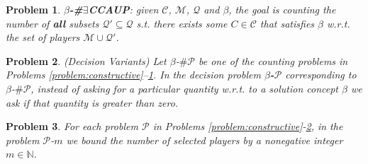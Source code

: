 \documentclass[letterpaper]{article} %
\newtheorem{problem}{Problem}
\newtheorem{remark}{Remark}
\begin{document}
\begin{problem}
\label{problem:exists-CCAUP}
{\normalfont \textbf{$\beta$-\#$\exists$CCAUP}:} given $\mathcal{C}$, $\mathcal{M}$, $\mathcal{Q}$ and $\beta$, the goal is counting the number of \textbf{all} subsets $\mathcal{Q}' \subseteq \mathcal{Q}$ s.t. there exists some $C \in \mathcal{C}$ that satisfies $\beta$ w.r.t. the set of players $\mathcal{M} \cup \mathcal{Q}'$.
\end{problem}
\begin{problem}
\label{problem:Decision}
{\normalfont (Decision Variants)}
Let {\normalfont $\beta$-$\# \mathcal{P}$} be one of the counting problems in Problems \ref{problem:constructive}--\ref{problem:exists-CCAUP}. In the decision problem {\normalfont \textbf{$\beta$-$\mathcal{P}$}} corresponding to {\normalfont $\beta$-$\#\mathcal{P}$}, instead of asking for a particular quantity w.r.t. to a solution concept $\beta$ we ask if that quantity is greater than zero.
\end{problem}
\begin{problem}
\label{problem:bounded}
For each problem {\normalfont $\mathcal{P}$} in Problems \ref{problem:constructive}-\ref{problem:Decision}, in the problem {\normalfont $\mathcal{P}$-$m$} we bound the number of selected players by a nonegative integer $m \in \mathbb{N}$.
\end{problem}
\end{document}
